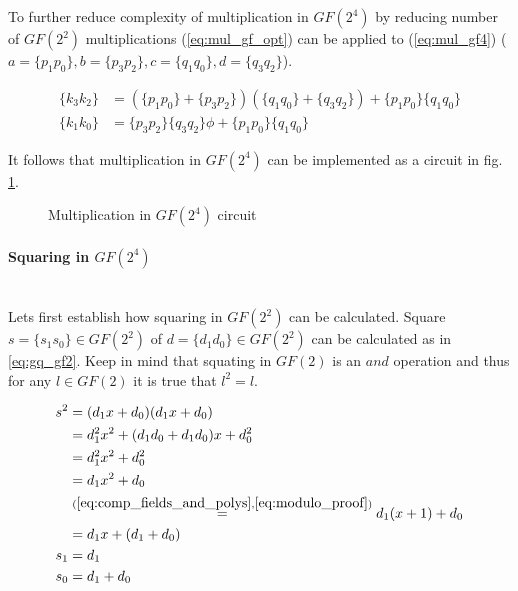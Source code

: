 To further reduce complexity of multiplication in $GF(2^4)$ by reducing number of $GF(2^2)$ multiplications (\ref{eq:mul_gf_opt}) can be applied to (\ref{eq:mul_gf4}) ($a = \{p_1p_0\}, b = \{p_3p_2\}, c = \{q_1q_0\}, d = \{q_3q_2\}$).

\begin{equation}
\label{eq:mul_gf4_final}
\begin{aligned}
\{k_3k_2\} &= (\{p_1p_0\} + \{p_3p_2\})(\{q_1q_0\} + \{q_3q_2\}) + \{p_1p_0\}\{q_1q_0\}\\
\{k_1k_0\} &= \{p_3p_2\}\{q_3q_2\}\phi + \{p_1p_0\}\{q_1q_0\}
\end{aligned}
\end{equation}



It follows that multiplication in $GF(2^4)$ can be implemented as a circuit in fig. \ref{fig:mul_gf4}.

\begin{figure}[!h]
\label{fig:mul_gf4}
\missingfigure[figwidth=6cm]{}
\caption{Multiplication in $GF(2^4)$ circuit}
\end{figure}




\paragraph{Squaring in $GF(2^4)$}\mbox{}\\
Lets first establish how squaring in $GF(2^2)$ can be calculated. 
Square $s = \{s_1s_0\} \in GF(2^2)$ of $d = \{d_1d_0\} \in GF(2^2)$ can be calculated as in \ref{eq:gq_gf2}. Keep in mind that squating in $GF(2)$ is an $and$ operation and thus for any $l \in GF(2)$ it is true that $l^2 = l$.

\begin{equation}
\label{eq:sq_gf2}
\begin{aligned}
s^2 &= (d_1x + d_0)(d_1x + d_0) \\
&= d_1^2x^2 + (d_1d_0 + d_1d_0)x + d_0^2 \\
&= d_1^2x^2 + d_0^2 \\
&= d_1x^2 + d_0\\
&\stackrel{(\ref{eq:comp_fields_and_polys}, \ref{eq:modulo_proof})}{=}
d_1(x + 1) + d_0 \\
&= d_1x + (d_1 + d_0)\\
s_1 &= d_1\\
s_0 &= d_1 + d_0
\end{aligned}
\end{equation}

